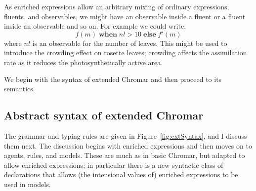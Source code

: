 As enriched expressions allow an arbitrary mixing of ordinary expressions,
fluents, and observables, we might have an observable inside a fluent or a
fluent inside an observable and so on. For example we could write:
\begin{equation*}
f(m) \; \mathbf{when} \; nl > 10 \; \mathbf{else} \; f'(m)
\end{equation*}
where $nl$ is an observable for the number of leaves. This might be used to
introduce the crowding effect on rosette leaves; crowding affects the
assimilation rate as it %
reduces the photosynthetically active area.

We begin with the syntax of extended Chromar and then proceed to its semantics.

\subsection{Abstract syntax of extended Chromar}
\label{sec:extSyntax}

The grammar and typing rules are given in Figure~\ref{fig:extSyntax}, and I
discuss them next. The discussion begins with enriched expressions and then
moves on to agents, rules, and models. These are much as in basic Chromar, but
adapted to allow enriched expressions; in particular there is a new syntactic
class of declarations that allows (the intensional values of) enriched
expressions to be used in models.

